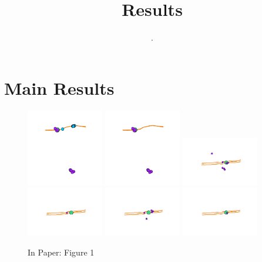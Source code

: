 \documentclass[9pt]{article}
\title{Results}
\author{.}
\begin{document}
\maketitle

\newpage
\section{Main Results}

\begin{figure}[H]
\centering
\includegraphics[width=0.3\textwidth]{figures/figure_1a.png}
\includegraphics[width=0.3\textwidth]{figures/figure_1b.png}
\includegraphics[width=0.3\textwidth]{figures/figure_1c.png}
\includegraphics[width=0.3\textwidth]{figures/figure_1d.png}
\includegraphics[width=0.3\textwidth]{figures/figure_1e.png}
\includegraphics[width=0.3\textwidth]{figures/figure_1f.png}
\caption{In Paper: Figure 1}
\end{figure}
\end{document}
